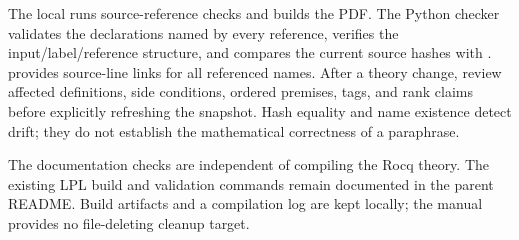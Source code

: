 The local  runs source-reference checks and builds the PDF.
The Python checker validates the declarations named by every
\code{\rocq} reference, verifies the input/label/reference structure, and
compares the current source hashes with .
 provides source-line links for all referenced names.
After a theory change, review affected definitions, side conditions, ordered
premises, tags, and rank claims before explicitly refreshing the snapshot.
Hash equality and name existence detect drift; they do not establish the
mathematical correctness of a paraphrase.

The documentation checks are independent of compiling the Rocq theory.
The existing LPL build and validation commands remain documented in the
parent README. Build artifacts and a compilation log are kept locally;
the manual provides no file-deleting cleanup target.
